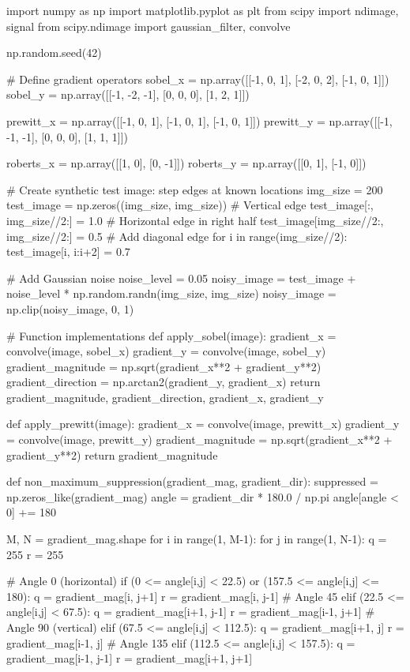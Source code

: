 \documentclass[a4paper, 11pt]{article}
\begin{document}
\begin{pycode}
import numpy as np
import matplotlib.pyplot as plt
from scipy import ndimage, signal
from scipy.ndimage import gaussian_filter, convolve

np.random.seed(42)

# Define gradient operators
sobel_x = np.array([[-1, 0, 1], [-2, 0, 2], [-1, 0, 1]])
sobel_y = np.array([[-1, -2, -1], [0, 0, 0], [1, 2, 1]])

prewitt_x = np.array([[-1, 0, 1], [-1, 0, 1], [-1, 0, 1]])
prewitt_y = np.array([[-1, -1, -1], [0, 0, 0], [1, 1, 1]])

roberts_x = np.array([[1, 0], [0, -1]])
roberts_y = np.array([[0, 1], [-1, 0]])

# Create synthetic test image: step edges at known locations
img_size = 200
test_image = np.zeros((img_size, img_size))
# Vertical edge
test_image[:, img_size//2:] = 1.0
# Horizontal edge in right half
test_image[img_size//2:, img_size//2:] = 0.5
# Add diagonal edge
for i in range(img_size//2):
    test_image[i, i:i+2] = 0.7

# Add Gaussian noise
noise_level = 0.05
noisy_image = test_image + noise_level * np.random.randn(img_size, img_size)
noisy_image = np.clip(noisy_image, 0, 1)

# Function implementations
def apply_sobel(image):
    gradient_x = convolve(image, sobel_x)
    gradient_y = convolve(image, sobel_y)
    gradient_magnitude = np.sqrt(gradient_x**2 + gradient_y**2)
    gradient_direction = np.arctan2(gradient_y, gradient_x)
    return gradient_magnitude, gradient_direction, gradient_x, gradient_y

def apply_prewitt(image):
    gradient_x = convolve(image, prewitt_x)
    gradient_y = convolve(image, prewitt_y)
    gradient_magnitude = np.sqrt(gradient_x**2 + gradient_y**2)
    return gradient_magnitude

def non_maximum_suppression(gradient_mag, gradient_dir):
    suppressed = np.zeros_like(gradient_mag)
    angle = gradient_dir * 180.0 / np.pi
    angle[angle < 0] += 180

    M, N = gradient_mag.shape
    for i in range(1, M-1):
        for j in range(1, N-1):
            q = 255
            r = 255

            # Angle 0 (horizontal)
            if (0 <= angle[i,j] < 22.5) or (157.5 <= angle[i,j] <= 180):
                q = gradient_mag[i, j+1]
                r = gradient_mag[i, j-1]
            # Angle 45
            elif (22.5 <= angle[i,j] < 67.5):
                q = gradient_mag[i+1, j-1]
                r = gradient_mag[i-1, j+1]
            # Angle 90 (vertical)
            elif (67.5 <= angle[i,j] < 112.5):
                q = gradient_mag[i+1, j]
                r = gradient_mag[i-1, j]
            # Angle 135
            elif (112.5 <= angle[i,j] < 157.5):
                q = gradient_mag[i-1, j-1]
                r = gradient_mag[i+1, j+1]


\end{pycode}
\end{document}
